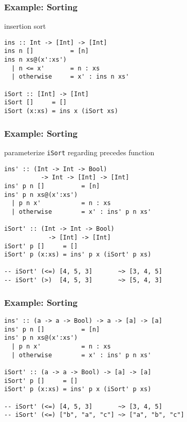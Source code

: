 \documentclass[dvipsnames]{beamer}
\theoremstyle{plain}
\begin{document}
\begin{frame}[fragile]
  \frametitle{Example: Sorting}

  \begin{exampleblock}{insertion sort}
    \begin{lstlisting}
ins :: Int -> [Int] -> [Int]
ins n []          = [n]
ins n xs@(x':xs')
  | n <= x'       = n : xs
  | otherwise     = x' : ins n xs'

iSort :: [Int] -> [Int]
iSort []     = []
iSort (x:xs) = ins x (iSort xs)
    \end{lstlisting}
  \end{exampleblock}
\end{frame}

\begin{frame}[fragile]
  \frametitle{Example: Sorting}

  \begin{exampleblock}{parameterize \lstinline|iSort| regarding precedes
      function}
    \begin{lstlisting}
ins' :: (Int -> Int -> Bool)
          -> Int -> [Int] -> [Int]
ins' p n []          = [n]
ins' p n xs@(x':xs')
  | p n x'           = n : xs
  | otherwise        = x' : ins' p n xs'

iSort' :: (Int -> Int -> Bool)
            -> [Int] -> [Int]
iSort' p []     = []
iSort' p (x:xs) = ins' p x (iSort' p xs)

-- iSort' (<=) [4, 5, 3]       ~> [3, 4, 5]
-- iSort' (>)  [4, 5, 3]       ~> [5, 4, 3]
    \end{lstlisting}
  \end{exampleblock}
\end{frame}

\begin{frame}[fragile]
  \frametitle{Example: Sorting}

  \begin{exampleblock}{}
    \begin{lstlisting}
ins' :: (a -> a -> Bool) -> a -> [a] -> [a]
ins' p n []          = [n]
ins' p n xs@(x':xs')
  | p n x'           = n : xs
  | otherwise        = x' : ins' p n xs'

iSort' :: (a -> a -> Bool) -> [a] -> [a]
iSort' p []     = []
iSort' p (x:xs) = ins' p x (iSort' p xs)

-- iSort' (<=) [4, 5, 3]       ~> [3, 4, 5]
-- iSort' (<=) ["b", "a", "c"] ~> ["a", "b", "c"]
    \end{lstlisting}
  \end{exampleblock}
\end{frame}
\end{document}
